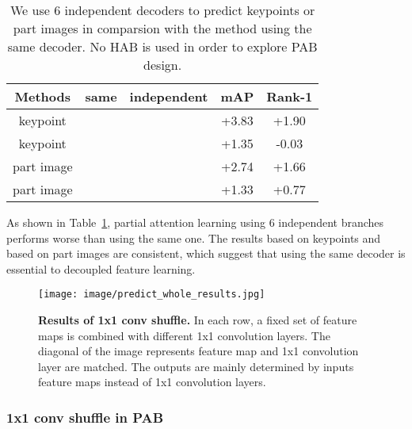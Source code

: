 \documentclass[10pt,twocolumn,letterpaper]{article}
\begin{document}
\begin{table}[h]
	\begin{center}
		\begin{tabular}{ccccc}
			\hline
			Methods & same & independent & mAP & Rank-1 \bigstrut\\
			\hline
keypoint 	& \checkmark & & +3.83 & +1.90 \bigstrut[t]\\
			keypoint 	& & \checkmark & +1.35 & -0.03 \\
			part image 	& \checkmark & & +2.74 & +1.66 \\
			part image  & & \checkmark & +1.33 & +0.77 \bigstrut[b]\\
\hline
		\end{tabular}
	\end{center}
	\caption{We use 6 independent decoders to predict keypoints or part images in comparsion with the method using the same decoder. No HAB is used in order to explore PAB design.}
	\label{ablation_weights_sharing}
\end{table}

As shown in Table~\ref{ablation_weights_sharing}, partial attention learning using 6 independent branches performs worse than using the same one. The results based on keypoints and based on part images are consistent, which suggest that using the same decoder is essential to decoupled feature learning. 

\begin{figure*}[htbp]
	\begin{center}
		\begin{minipage}[t]{\linewidth}
			\vspace{-1mm}
\texttt{[image: image/predict\_whole\_results.jpg]}
		\end{minipage}
	\end{center}
	\vspace{-1mm}
	\caption{\textbf{Results of 1x1 conv shuffle.} In each row, a fixed set of feature maps is combined with different 1x1 convolution layers. The diagonal of the image represents feature map and 1x1 convolution layer are matched. The outputs are mainly determined by inputs feature maps instead of 1x1 convolution layers.
	}
	\label{image:shuffle_outputs}
\end{figure*}





\subsubsection{1x1 conv shuffle in PAB}
\end{document}
